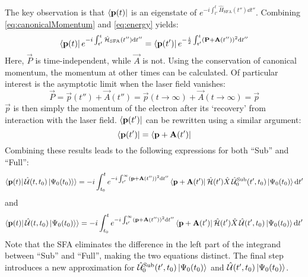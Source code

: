 The key observation is that $\bra{\mathbf{p}(t)}$ is an eigenstate of $e^{-i \int_{t'}^{t} \hat{H}_{\mathrm{SFA}}(t'') \dd t''}$. 
Combining \eqref{eq:canonicalMomentum} and \eqref{eq:energy} yields:
\begin{equation*}   %
    \bra{\vec{p}(t)}e^{-i \int_{t'}^{t} \hat{\Hs}_{\mathrm{SFA}}(t'') \dd t''} = \bra{\vec{p}(t')}e^{-\frac{i}{2} \int_{t'}^{t} (\vec{P} + \vec{A}(t''))^2 \dd t''}
\end{equation*}
Here, $\vec{P}$ is time-independent, while $\vec{A}$ is not.
Using the conservation of canonical momentum, the momentum at other times can be calculated. 
Of particular interest is the asymptotic limit when the laser field vanishes:
\begin{equation*}
    \vec{P} = \vec{p}(t'') + \vec{A}(t'') = \vec{p}(t\rightarrow \infty) + \vec{A}(t\rightarrow \infty) = \vec{p}
\end{equation*}
$\vec{p}$ is then simply the momentum of the electron after its `recovery' from interaction with the laser field.
$\bra{\mathbf{p}(t')}$ can be rewritten using a similar argument:
\begin{equation*}
    \bra{\mathbf{p}(t')} = \bra{\mathbf{p} + \mathbf{A}(t')}
\end{equation*}
Combining these results leads to the following expressions for both ``Sub'' and ``Full'':
\begin{equation}        %
    \braket{\vec{p}(t)|\,\hat{\U}(t,t_0)\ket{\Psi_0(t_0)}} = -i \int_{t_0}^{t} e^{-i \int_{t'}^{\infty} (\vec{p} + \vec{A}(t''))^2 \dd t''}\bra{\vec{p}+\vec{A}(t')}\hat{\Hs}(t')\hat{X}\, \hat{\U}^{\mathrm{Sub}}_0(t',t_0)\ket{\Psi_0(t_0)} \dd t' \label{eq:smatrixlike1}
\end{equation}
and
\begin{equation}
    \braket{\mathbf{p}(t)|\,\hat{\mathcal{U}}(t,t_0)\ket{\Psi_0(t_0)}} = -i \int_{t_0}^{t} e^{-i \int_{t'}^{\infty} (\mathbf{p} + \mathbf{A}(t''))^2 \mathrm{d} t''}\bra{\mathbf{p}+\mathbf{A}(t')}\hat{\mathcal{H}}(t')\hat{X}\, \hat{\mathcal{U}}(t',t_0)\ket{\Psi_0(t_0)} \mathrm{d} t' \label{eq:smatrixlike2}
\end{equation}
Note that the SFA eliminates the difference in the left part of the integrand between ``Sub'' and ``Full'', making the two equations distinct. 
The final step introduces a new approximation for $\hat{\mathcal{U}}^{\mathrm{Sub}}_0(t',t_0)\ket{\Psi_0(t_0)}$ and $\hat{\mathcal{U}}(t',t_0)\ket{\Psi_0(t_0)}$.

